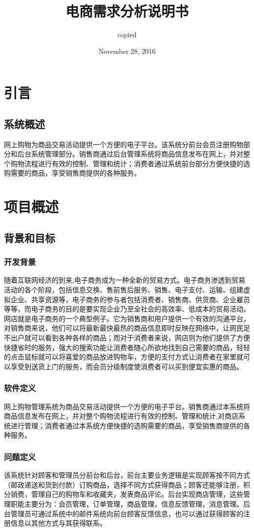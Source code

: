 \documentclass[UTF8, a4paper]{ctexrep}
\title{电商需求分析说明书}
\date{November 28, 2016}
\author{copied}
\begin{document}
	\maketitle
	
	\chapter{引言}
	\section{系统概述}
	网上购物为商品交易活动提供一个方便的电子平台。该系统分前台会员注册购物部分和后台系统管理部分。销售商通过后台管理系统将商品信息发布在网上，并对整个购物流程进行有效的控制、管理和统计；消费者通过系统前台部分方便快捷的选购需要的商品，享受销售商提供的各种服务。
	
	\chapter{项目概述}
	\section{背景和目标}
	\subsection{开发背景}
	随着互联网经济的到来,电子商务成为一种全新的贸易方式。电子商务渗透到贸易活动的各个阶段，包括信息交换、售前售后服务、销售、电子支付、运输、组建虚拟企业、共享资源等，电子商务的参与者包括消费者、销售商、供货商、企业雇员等等，而电子商务的目的是要实现企业乃至全社会的高效率、低成本的贸易活动。网店就是电子商务的一个典型例子。它为销售商和用户提供一个有效的沟通平台，对销售商来说，他们可以将最新最快最热的商品信息即时反映在网络中，让网民足不出户就可以看到各种各样的商品；而对于消费者来说，网店则为他们提供了方便快捷省时的服务，强大的搜索功能让消费者随心所欲地找到自己需要的商品，轻轻的点击鼠标就可以将喜爱的商品放进购物车，方便的支付方式让消费者在家里就可以享受到送货上门的服务，而会员分级制度使消费者可以买到便宜实惠的商品。
	\subsection{软件定义}
	网上购物管理系统为商品交易活动提供一个方便的电子平台。销售商通过本系统将商品信息发布在网上，并对整个购物流程进行有效的控制、管理和统计,对商店系统进行管理；消费者通过本系统方便快捷的选购需要的商品，享受销售商提供的各种服务。
	\subsection{问题定义}
	该系统针对顾客和管理员分前台和后台，前台主要业务逻辑是实现顾客按不同方式（邮政递送和货到付款）订购商品，选择不同方式获得商品；顾客还能够注册，积分销费，管理自己的购物车和收藏夹，发表商品评论。后台实现商店管理，这些管理职能主要分为：会员管理，订单管理，商品管理，信息反馈管理，消息管理。后台管理员可通过系统中的邮件系统向前台顾客反馈信息，也可以通过获得顾客的注册信息以其他方式与其获得联系。
	
\end{document}
